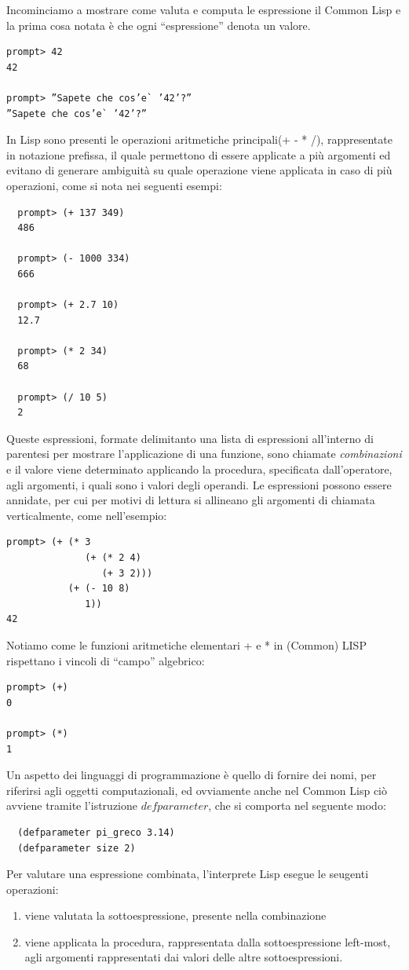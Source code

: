 \documentclass[a4paper]{book}
\begin{document}
Incominciamo a mostrare come valuta e computa le espressione il Common Lisp
e la prima cosa notata è che ogni ``espressione'' denota un valore.
\begin{verbatim}
prompt> 42
42

prompt> ”Sapete che cos’e` ’42’?”
”Sapete che cos’e` ’42’?”
\end{verbatim}
In Lisp sono presenti le operazioni aritmetiche principali(+ - * /), rappresentate in notazione prefissa,
il quale permettono di essere applicate a più argomenti ed evitano di generare ambiguità su quale operazione viene
applicata in caso di più operazioni, come si nota nei seguenti esempi:
\begin{verbatim}
  prompt> (+ 137 349)
  486

  prompt> (- 1000 334)
  666

  prompt> (+ 2.7 10)
  12.7

  prompt> (* 2 34)
  68
  
  prompt> (/ 10 5)
  2
\end{verbatim}
Queste espressioni, formate delimitanto una lista di espressioni all'interno di parentesi per mostrare l'applicazione di una funzione,
sono chiamate \emph{combinazioni} e il valore viene determinato applicando la procedura, specificata dall'operatore, agli argomenti,
i quali sono i valori degli operandi.
Le espressioni possono essere annidate, per cui per motivi di lettura si allineano gli argomenti di chiamata verticalmente, come nell'esempio:
\begin{verbatim}
prompt> (+ (* 3
              (+ (* 2 4)
                 (+ 3 2)))
           (+ (- 10 8)
              1))
42
\end{verbatim}
Notiamo come le funzioni aritmetiche elementari + e * in (Common) LISP rispettano i vincoli di “campo” algebrico:
\begin{verbatim}
prompt> (+)
0

prompt> (*)
1
\end{verbatim}
Un aspetto dei linguaggi di programmazione è quello di fornire dei nomi, per riferirsi agli oggetti computazionali,
ed ovviamente anche nel Common Lisp ciò avviene tramite l'istruzione $defparameter$, che si comporta nel seguente modo:
\begin{verbatim}
  (defparameter pi_greco 3.14)
  (defparameter size 2)
\end{verbatim}
Per valutare una espressione combinata, l'interprete Lisp esegue le seugenti operazioni:
\begin{enumerate}
\item viene valutata la sottoespressione, presente nella combinazione
\item viene applicata la procedura, rappresentata dalla sottoespressione left-most, agli argomenti
  rappresentati dai valori delle altre sottoespressioni.
\end{enumerate}
\end{document}
